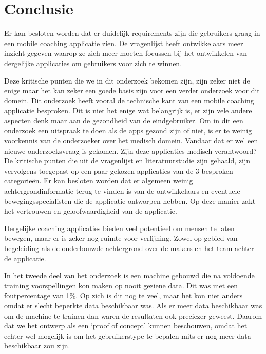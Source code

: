 
\chapter{Conclusie}
\label{ch:conclusie}


Er kan besloten worden dat er duidelijk requirements zijn die gebruikers graag in een mobile coaching applicatie zien. De vragenlijst heeft ontwikkelaars meer inzicht gegeven waarop ze zich meer moeten focussen bij het ontwikkelen van dergelijke applicaties om gebruikers voor zich te winnen. 

Deze kritische punten die we in dit onderzoek bekomen zijn, zijn zeker niet de enige maar het kan zeker een goede basis zijn voor een verder onderzoek voor dit domein. Dit onderzoek heeft vooral de technische kant van een mobile coaching applicatie besproken. Dit is niet het enige wat belangrijk is, er zijn vele andere aspecten denk maar aan de gezondheid van de eindgebruiker. Om in dit een onderzoek een uitspraak te doen als de apps gezond zijn of niet, is er te weinig voorkennis van de onderzoeker over het medisch domein. Vandaar dat er wel een nieuwe onderzoeksvraag is gekomen. Zijn deze applicaties medisch verantwoord? 
De kritische punten die uit de vragenlijst en literatuurstudie zijn gehaald, zijn vervolgens toegepast op een paar gekozen applicaties van de 3 besproken categorieën. Er kan besloten worden dat er algemeen weinig achtergrondinformatie terug te vinden is van de ontwikkelaars en eventuele bewegingsspecialisten die de applicatie ontworpen hebben. Op deze manier zakt het vertrouwen en geloofwaardigheid van de applicatie. 

Dergelijke coaching applicaties bieden veel potentieel om mensen te laten bewegen, maar er is zeker nog ruimte voor verfijning. Zowel op gebied van begeleiding als de onderbouwde achtergrond  over  de makers en het team achter de applicatie.

In het tweede deel van het onderzoek is een machine gebouwd die na voldoende training voorspellingen kon maken op nooit geziene data. Dit was met een foutpercentage van 1\%. Op zich is dit nog te veel, maar het kon niet anders omdat er slecht beperkte data beschikbaar was. Als er meer data beschikbaar was om de machine te trainen dan waren de resultaten ook preciezer geweest. Daarom dat we het ontwerp als een ‘proof of concept’ kunnen beschouwen, omdat het echter wel mogelijk is om het gebruikerstype te bepalen mits er nog meer data beschikbaar zou zijn. 


